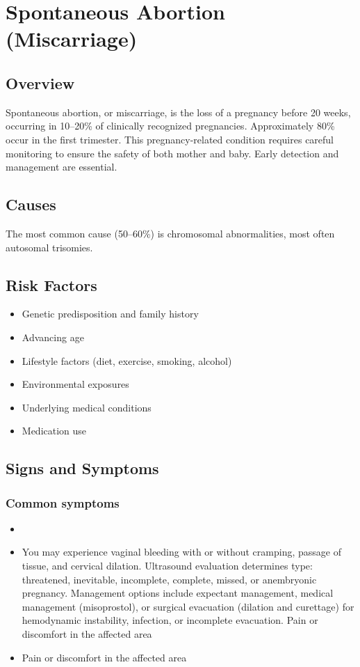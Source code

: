 \chapter{Spontaneous Abortion (Miscarriage)}
\label{sec:Spontaneous Abortion}

\section{Overview}
Spontaneous abortion, or miscarriage, is the loss of a pregnancy before 20 weeks, occurring in 10--20\% of clinically recognized pregnancies. Approximately 80\% occur in the first trimester. This pregnancy-related condition requires careful monitoring to ensure the safety of both mother and baby. Early detection and management are essential.
\section{Causes}
The most common cause (50--60\%) is chromosomal abnormalities, most often autosomal trisomies.     
\section{Risk Factors}

\begin{itemize}[noitemsep]
  \item Genetic predisposition and family history
  \item Advancing age
  \item Lifestyle factors (diet, exercise, smoking, alcohol)
  \item Environmental exposures
  \item Underlying medical conditions
  \item Medication use
\end{itemize}
\section{Signs and Symptoms}

\subsection{Common symptoms}
\begin{itemize}[noitemsep]
  \item \item You may experience vaginal bleeding with or without cramping, passage of tissue, and cervical dilation. Ultrasound evaluation determines type: threatened, inevitable, incomplete, complete, missed, or anembryonic pregnancy. Management options include expectant management, medical management (misoprostol), or surgical evacuation (dilation and curettage) for hemodynamic instability, infection, or incomplete evacuation. Pain or discomfort in the affected area    \item Pain or discomfort in the affected area
  \end{itemize}

